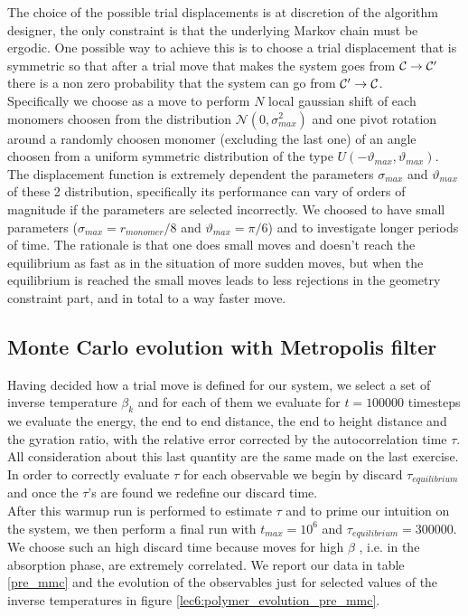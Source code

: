 The choice of the possible trial displacements is at discretion of the algorithm designer, the only constraint is that the underlying Markov 
chain must be ergodic. One possible way to achieve this is to choose a trial displacement that is symmetric so that after a trial move that makes 
the system goes from $\mathcal{C} \to \mathcal{C}'$ there is a non zero probability that the system can go from $\mathcal{C}' \to \mathcal{C}$. \\
Specifically we choose as a move to perform $N$ local gaussian shift of each monomers choosen from the distribution $\mathcal{N}(0, \sigma_{max}^2)$ and one pivot rotation around a 
randomly choosen monomer (excluding the last one) of an angle choosen from a uniform symmetric distribution of the type $U(-\vartheta_{max}, \vartheta_{max})$. \\
The displacement function is extremely dependent the parameters $\sigma_{max}$ and $\vartheta_{max}$ of these 2 distribution, specifically its performance can 
vary of orders of magnitude if the parameters are selected incorrectly. 
We choosed to have small parameters ($\sigma_{max} = r_{monomer}/8$ and $\vartheta_{max} = \pi /6 $) and to investigate longer periods of time. The rationale is that one does small moves and doesn't reach 
the equilibrium as fast as in the situation of more sudden moves, but when the equilibrium is reached the small moves leads to less rejections
in the geometry constraint part, and in total to a way faster move.

\subsection*{Monte Carlo evolution with Metropolis filter}
Having decided how a trial move is defined for our system, we select a set of inverse temperature $\beta_k$ and for each of them we evaluate for $t = 100000$ timesteps
we evaluate the energy, the end to end distance, the end to height distance and the gyration ratio, with the relative error corrected by the
autocorrelation time $\tau$. All consideration about this last quantity are the same made on the last exercise. \\
In order to correctly evaluate $\tau$ for each observable we begin by discard $\tau_{equilibrium}$ and 
once the $\tau$'s are found we redefine our discard time.\\
After this warmup run is performed to estimate $\tau$ and to prime our intuition on the system, we then perform a final run with $t_{max} = 10^6$ and $\tau_{equilibrium} = 300000$.
We choose such an high discard time because moves for high $\beta$ , i.e. in the absorption phase, are extremely correlated.
We report our data in table \ref{pre_mmc} and the evolution of the observables just for selected values of the inverse temperatures in figure \ref{lec6:polymer_evolution_pre_mmc}.

